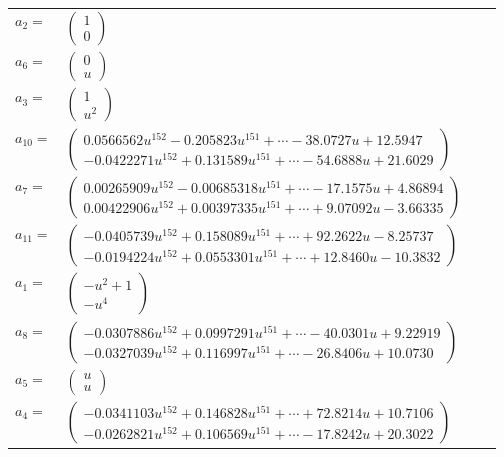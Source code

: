 \documentclass[1p]{elsarticle_modified}
\theoremstyle{definition}
\begin{document}
\begin{tabular}{m{7pt} m{180pt} m{7pt} m{180pt} }
\flushright $a_{2}=$&$\begin{pmatrix}1\\0\end{pmatrix}$ \\
\flushright $a_{6}=$&$\begin{pmatrix}0\\u\end{pmatrix}$ \\
\flushright $a_{3}=$&$\begin{pmatrix}1\\u^2\end{pmatrix}$ \\
\flushright $a_{10}=$&$\begin{pmatrix}0.0566562 u^{152}-0.205823 u^{151}+\cdots-38.0727 u+12.5947\\-0.0422271 u^{152}+0.131589 u^{151}+\cdots-54.6888 u+21.6029\end{pmatrix}$ \\
\flushright $a_{7}=$&$\begin{pmatrix}0.00265909 u^{152}-0.00685318 u^{151}+\cdots-17.1575 u+4.86894\\0.00422906 u^{152}+0.00397335 u^{151}+\cdots+9.07092 u-3.66335\end{pmatrix}$ \\
\flushright $a_{11}=$&$\begin{pmatrix}-0.0405739 u^{152}+0.158089 u^{151}+\cdots+92.2622 u-8.25737\\-0.0194224 u^{152}+0.0553301 u^{151}+\cdots+12.8460 u-10.3832\end{pmatrix}$ \\
\flushright $a_{1}=$&$\begin{pmatrix}- u^2+1\\- u^4\end{pmatrix}$ \\
\flushright $a_{8}=$&$\begin{pmatrix}-0.0307886 u^{152}+0.0997291 u^{151}+\cdots-40.0301 u+9.22919\\-0.0327039 u^{152}+0.116997 u^{151}+\cdots-26.8406 u+10.0730\end{pmatrix}$ \\
\flushright $a_{5}=$&$\begin{pmatrix}u\\u\end{pmatrix}$ \\
\flushright $a_{4}=$&$\begin{pmatrix}-0.0341103 u^{152}+0.146828 u^{151}+\cdots+72.8214 u+10.7106\\-0.0262821 u^{152}+0.106569 u^{151}+\cdots-17.8242 u+20.3022\end{pmatrix}$ \\

\end{tabular}
\end{document}
